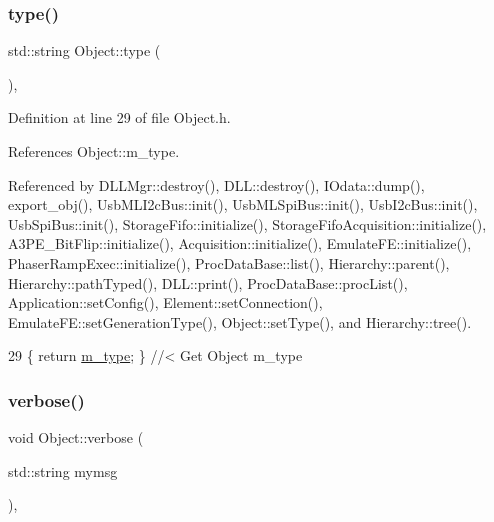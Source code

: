 \subsubsection{\texorpdfstring{type()}{type()}}
{\footnotesize\ttfamily std\+::string Object\+::type (\begin{DoxyParamCaption}{ }\end{DoxyParamCaption})\hspace{0.3cm}{\ttfamily [inline]}, {\ttfamily [inherited]}}



Definition at line 29 of file Object.\+h.



References Object\+::m\+\_\+type.



Referenced by D\+L\+L\+Mgr\+::destroy(), D\+L\+L\+::destroy(), I\+Odata\+::dump(), export\+\_\+obj(), Usb\+M\+L\+I2c\+Bus\+::init(), Usb\+M\+L\+Spi\+Bus\+::init(), Usb\+I2c\+Bus\+::init(), Usb\+Spi\+Bus\+::init(), Storage\+Fifo\+::initialize(), Storage\+Fifo\+Acquisition\+::initialize(), A3\+P\+E\+\_\+\+Bit\+Flip\+::initialize(), Acquisition\+::initialize(), Emulate\+F\+E\+::initialize(), Phaser\+Ramp\+Exec\+::initialize(), Proc\+Data\+Base\+::list(), Hierarchy\+::parent(), Hierarchy\+::path\+Typed(), D\+L\+L\+::print(), Proc\+Data\+Base\+::proc\+List(), Application\+::set\+Config(), Element\+::set\+Connection(), Emulate\+F\+E\+::set\+Generation\+Type(), Object\+::set\+Type(), and Hierarchy\+::tree().


\begin{DoxyCode}
29 \{ \textcolor{keywordflow}{return} \hyperlink{classObject_a457a600fe8c00eb1034374f75110a78c}{m\_type};       \} \textcolor{comment}{//< Get Object m\_type}
\end{DoxyCode}
\mbox{\label{classObject_a83d2db2df682907ea1115ad721c1c4a1}} 
\subsubsection{\texorpdfstring{verbose()}{verbose()}\hspace{0.1cm}{\footnotesize\ttfamily [1/2]}}
{\footnotesize\ttfamily void Object\+::verbose (\begin{DoxyParamCaption}\item[{std\+::string}]{mymsg }\end{DoxyParamCaption})\hspace{0.3cm}{\ttfamily [inline]}, {\ttfamily [inherited]}}



